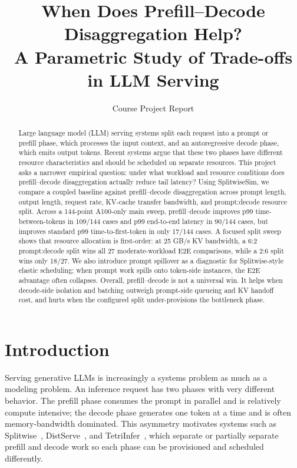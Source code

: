 \documentclass[10pt]{article}
\title{\vspace{-0.35in}When Does Prefill--Decode Disaggregation Help?\\
\large A Parametric Study of Trade-offs in LLM Serving}
\author{Course Project Report}
\date{}
\newcommand{\pd}{prefill--decode}
\begin{document}
\maketitle
\vspace{-0.25in}

\begin{abstract}
Large language model (LLM) serving systems split each request into a prompt or prefill phase, which processes the input context, and an autoregressive decode phase, which emits output tokens. Recent systems argue that these two phases have different resource characteristics and should be scheduled on separate resources. This project asks a narrower empirical question: under what workload and resource conditions does \pd{} disaggregation actually reduce tail latency? Using SplitwiseSim, we compare a coupled baseline against \pd{} disaggregation across prompt length, output length, request rate, KV-cache transfer bandwidth, and prompt:decode resource split. Across a 144-point A100-only main sweep, \pd{} improves p99 time-between-tokens in 109/144 cases and p99 end-to-end latency in 90/144 cases, but improves standard p99 time-to-first-token in only 17/144 cases. A focused split sweep shows that resource allocation is first-order: at 25 GB/s KV bandwidth, a 6:2 prompt:decode split wins all 27 moderate-workload E2E comparisons, while a 2:6 split wins only 18/27. We also introduce prompt spillover as a diagnostic for Splitwise-style elastic scheduling; when prompt work spills onto token-side instances, the E2E advantage often collapses. Overall, \pd{} is not a universal win. It helps when decode-side isolation and batching outweigh prompt-side queueing and KV handoff cost, and hurts when the configured split under-provisions the bottleneck phase.
\end{abstract}

\section{Introduction}
Serving generative LLMs is increasingly a systems problem as much as a modeling problem. An inference request has two phases with very different behavior. The prefill phase consumes the prompt in parallel and is relatively compute intensive; the decode phase generates one token at a time and is often memory-bandwidth dominated. This asymmetry motivates systems such as Splitwise~\citep{splitwise2024}, DistServe~\citep{distserve2024}, and TetriInfer~\citep{tetriinfer2024}, which separate or partially separate prefill and decode work so each phase can be provisioned and scheduled differently.
\end{document}
